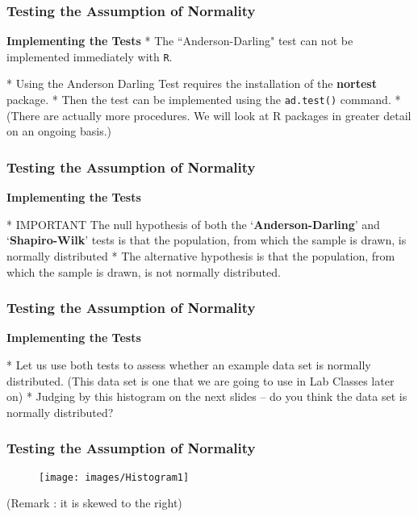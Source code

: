 
\frametitle{Testing the Assumption of Normality}

\textbf{Implementing the Tests}
* The ``Anderson-Darling" test can not be implemented immediately with \texttt{R}. 

*  Using the Anderson Darling Test requires the installation of the \textbf{nortest} package. 
*  Then the test can be implemented using the \texttt{ad.test()} command.
*  (There are actually more procedures. We will look at R packages in greater detail on an ongoing basis.)





\frametitle{Testing the Assumption of Normality}

\textbf{Implementing the Tests}

* \alert{IMPORTANT} The null hypothesis of both the `\textbf{Anderson-Darling}’ and `\textbf{Shapiro-Wilk}’ tests is that the population, from which the sample is drawn, is normally distributed 
*  The alternative hypothesis is that the population, from which the sample is drawn, is not normally distributed.






\frametitle{Testing the Assumption of Normality}

\textbf{Implementing the Tests}

* Let us use both tests to assess whether an example data set is normally distributed. (This data set is one that we are going to use in Lab Classes later on) 
* Judging by this histogram on the next slides – do you think the data set is normally distributed?






\frametitle{Testing the Assumption of Normality}

\begin{figure}
\centering
\texttt{[image: images/Histogram1]}
\end{figure}
(Remark : it is skewed to the right)


